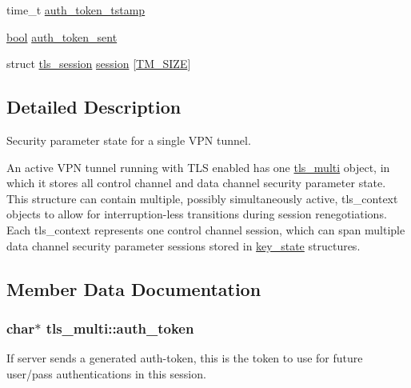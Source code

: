 \begin{DoxyCompactItemize}
\item 
time\+\_\+t \hyperlink{structtls__multi_a499dd009f7a000b432f0362b48c89b55}{auth\+\_\+token\+\_\+tstamp}
\item 
\hyperlink{automatic_8c_abb452686968e48b67397da5f97445f5b}{bool} \hyperlink{structtls__multi_a3a0e4ef1be4d294a440d01ae178546f8}{auth\+\_\+token\+\_\+sent}
\item 
struct \hyperlink{structtls__session}{tls\+\_\+session} \hyperlink{structtls__multi_a74e065e432f819307a830ef38d5be73c}{session} \mbox{[}\hyperlink{group__control__processor_gaa195349d22c113d3acc88b6795e491b8}{T\+M\+\_\+\+S\+I\+Z\+E}\mbox{]}
\end{DoxyCompactItemize}


\subsection{Detailed Description}
Security parameter state for a single V\+P\+N tunnel.

An active V\+P\+N tunnel running with T\+L\+S enabled has one {\ttfamily \hyperlink{structtls__multi}{tls\+\_\+multi}} object, in which it stores all control channel and data channel security parameter state. This structure can contain multiple, possibly simultaneously active, {\ttfamily tls\+\_\+context} objects to allow for interruption-\/less transitions during session renegotiations. Each {\ttfamily tls\+\_\+context} represents one control channel session, which can span multiple data channel security parameter sessions stored in {\ttfamily \hyperlink{structkey__state}{key\+\_\+state}} structures. 

\subsection{Member Data Documentation}
\hypertarget{structtls__multi_aa03c9a1c7487bd7bed7e4f73e266614d}{}
\subsubsection[{auth\+\_\+token}]{\setlength{\rightskip}{0pt plus 5cm}char$\ast$ tls\+\_\+multi\+::auth\+\_\+token}\label{structtls__multi_aa03c9a1c7487bd7bed7e4f73e266614d}
If server sends a generated auth-\/token, this is the token to use for future user/pass authentications in this session. \hypertarget{structtls__multi_a3a0e4ef1be4d294a440d01ae178546f8}{}
